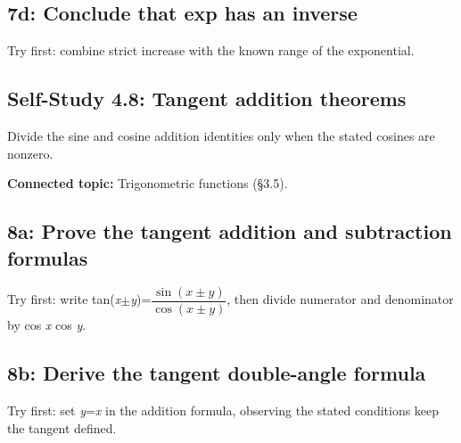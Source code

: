 \documentclass[11pt]{article}
\begin{document}
\begin{keepsection}
\begin{keepsection}
\subsection{7d: Conclude that exp has an inverse}

Try first: combine strict increase with the known range of the exponential.

\end{keepsection}
\end{keepsection}

\begin{keepsection}
\section{Self-Study 4.8: Tangent addition theorems}

Divide the sine and cosine addition identities only when the stated cosines are nonzero.

\textbf{Connected topic:} Trigonometric functions (§3.5).

\begin{keepsection}
\subsection{8a: Prove the tangent addition and subtraction formulas}

Try first: write tan(\textit{x}\ensuremath{\pm}\textit{y})={\small\ensuremath{\dfrac{\sin ({x}\pm {y})}{\cos ({x}\pm {y})}}}, then divide numerator and denominator by cos \textit{x} cos \textit{y}.

\end{keepsection}

\begin{keepsection}
\subsection{8b: Derive the tangent double-angle formula}

Try first: set \textit{y}=\textit{x} in the addition formula, observing the stated conditions keep the tangent defined.


\end{keepsection}
\end{keepsection}
\end{document}
